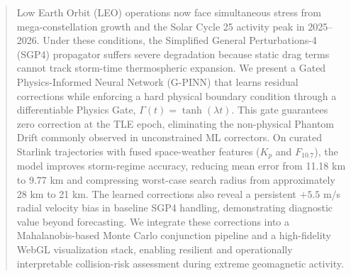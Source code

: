 \begin{abstract}
Low Earth Orbit (LEO) operations now face simultaneous stress from mega-constellation growth and the Solar Cycle 25 activity peak in 2025--2026. Under these conditions, the Simplified General Perturbations-4 (SGP4) propagator suffers severe degradation because static drag terms cannot track storm-time thermospheric expansion. We present a Gated Physics-Informed Neural Network (G-PINN) that learns residual corrections while enforcing a hard physical boundary condition through a differentiable Physics Gate, $\Gamma(t)=\tanh(\lambda t)$. This gate guarantees zero correction at the TLE epoch, eliminating the non-physical Phantom Drift commonly observed in unconstrained ML correctors. On curated Starlink trajectories with fused space-weather features ($K_p$ and $F_{10.7}$), the model improves storm-regime accuracy, reducing mean error from 11.18 km to 9.77 km and compressing worst-case search radius from approximately 28 km to 21 km. The learned corrections also reveal a persistent $+5.5$ m/s radial velocity bias in baseline SGP4 handling, demonstrating diagnostic value beyond forecasting. We integrate these corrections into a Mahalanobis-based Monte Carlo conjunction pipeline and a high-fidelity WebGL visualization stack, enabling resilient and operationally interpretable collision-risk assessment during extreme geomagnetic activity.
\end{abstract}
